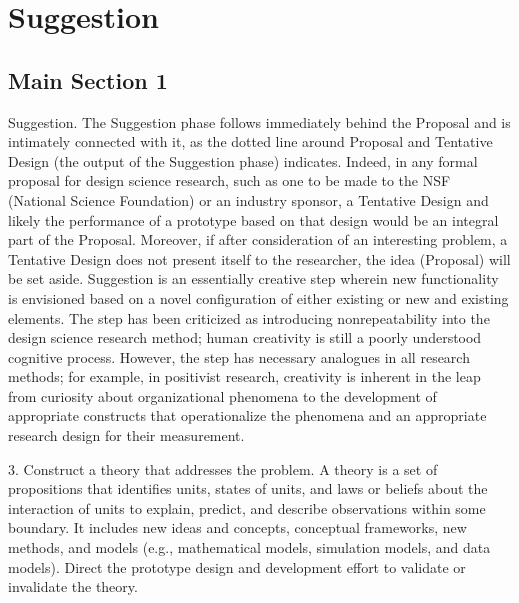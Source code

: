 
\chapter{Suggestion} %

\label{ChapterSuggestion} %


\section{Main Section 1}

Suggestion. The Suggestion phase follows immediately behind the Proposal and is intimately connected with it, as the dotted line around Proposal and Tentative Design (the output of the Suggestion phase) indicates. Indeed, in any formal proposal for design science research, such as one to be made to the NSF (National Science Foundation) or an industry sponsor, a Tentative Design and likely the performance of a prototype based on that design would be an integral part of the Proposal. Moreover, if after consideration of an interesting problem, a Tentative Design does not present itself to the researcher, the idea (Proposal) will be set aside. Suggestion is an essentially creative step wherein new functionality is envisioned based on a novel configuration of either existing or new and existing elements. The step has been criticized as introducing nonrepeatability into the design science research method; human creativity is still a poorly understood cognitive process. However, the step has necessary analogues in all research methods; for example, in positivist research, creativity is inherent in the leap from curiosity about organizational phenomena to the development of appropriate constructs that operationalize the phenomena and an appropriate research design for their measurement.
\cite{Vaishnavi2008}

3. Construct a theory that addresses the problem. A theory is a set of propositions that identifies units, states of units, and laws or beliefs about the interaction of units to explain, predict, and describe observations within some boundary. It includes new ideas and concepts, conceptual frameworks, new methods, and models (e.g., mathematical models, simulation models, and data models). Direct the prototype design and development effort to validate or invalidate the theory.
\cite{Vaishnavi2008}

